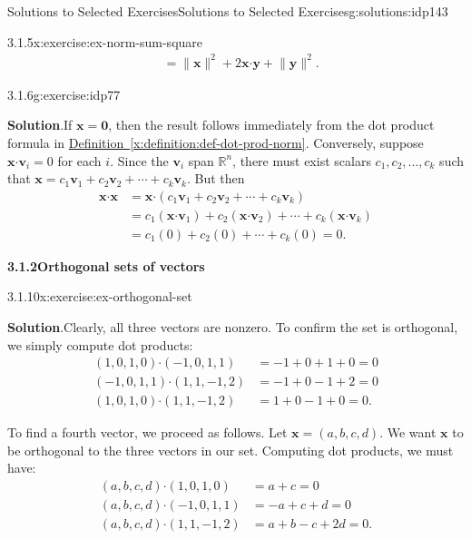 \documentclass[oneside,10pt,]{book}
\newcommand{\blocktitlefont}{\relax}
\newcommand{\xreffont}{\relax}
\numberwithin{equation}{section}
\newcommand{\R}{\mathbb{R}}
\newcommand{\dotp}{\!\boldsymbol{\cdot}\!}
\newcommand{\len}[1]{\lVert #1\rVert}
\newcommand{\vv}{\mathbf{v}}
\newcommand{\xx}{\mathbf{x}}
\newcommand{\yy}{\mathbf{y}}
\newcommand{\amp}{&}
\begin{document}
\begin{solutions-chapter}{Solutions to Selected Exercises}{}{Solutions to Selected Exercises}{}{}{g:solutions:idp143}
\begin{inlinesolution}{3.1.5}{}{x:exercise:ex-norm-sum-square}
\begin{align*}
\amp =\len{\xx}^2+2\xx\dotp\yy+\len{\yy}^2\text{.}
\end{align*}
%
\end{inlinesolution}%
\begin{inlinesolution}{3.1.6}{}{g:exercise:idp77}%
\par\smallskip%
\noindent\textbf{\blocktitlefont Solution}.\hypertarget{g:solution:idp166-back}{}\quad{}If \(\xx=\mathbf{0}\), then the result follows immediately from the dot product formula in \hyperref[x:definition:def-dot-prod-norm]{Definition~{\xreffont\ref{x:definition:def-dot-prod-norm}}}. Conversely, suppose \(\xx\dotp \vv_i=0\) for each \(i\). Since the \(\vv_i\) span \(\R^n\), there must exist scalars \(c_1,c_2,\ldots, c_k\) such that \(\xx=c_1\vv_1+c_2\vv_2+\cdots+c_k\vv_k\). But then%
\begin{align*}
\xx\dotp\xx \amp = \xx\dotp (c_1\vv_1+c_2\vv_2+\cdots+c_k\vv_k) \\
\amp = c_1(\xx\dotp \vv_1)+ c_2(\xx\dotp \vv_2)+\cdots +c_k(\xx\dotp \vv_k)\\
\amp = c_1(0)+c_2(0)+\cdots + c_k(0)=0\text{.}
\end{align*}
%
\end{inlinesolution}%
\par\medskip
\noindent\textbf{\Large{}3.1.2\space\textperiodcentered\space{}Orthogonal sets of vectors}
\begin{inlinesolution}{3.1.10}{}{x:exercise:ex-orthogonal-set}%
\par\smallskip%
\noindent\textbf{\blocktitlefont Solution}.\hypertarget{g:solution:idp167-back}{}\quad{}Clearly, all three vectors are nonzero. To confirm the set is orthogonal, we simply compute dot products:%
\begin{align*}
(1,0,1,0)\dotp (-1,0,1,1)\amp =-1+0+1+0=0\\
(-1,0,1,1)\dotp (1,1,-1,2)\amp =-1+0-1+2=0\\
(1,0,1,0)\dotp (1,1,-1,2) \amp = 1+0-1+0=0\text{.}
\end{align*}
%
\par
To find a fourth vector, we proceed as follows. Let \(\xx=(a,b,c,d)\). We want \(\xx\) to be orthogonal to the three vectors in our set. Computing dot products, we must have:%
\begin{align*}
(a,b,c,d)\dotp (1,0,1,0) \amp = a+c=0 \\
(a,b,c,d)\dotp (-1,0,1,1) \amp = -a+c+d=0 \\
(a,b,c,d)\dotp (1,1,-1,2) \amp = a+b-c+2d=0\text{.}
\end{align*}

\end{inlinesolution}
\end{solutions-chapter}
\end{document}

